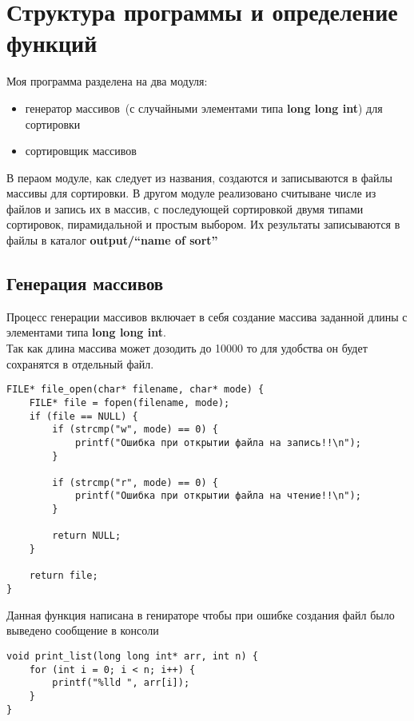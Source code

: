 \documentclass[a4paper,12pt,titlepage,finall]{article}
\begin{document}
\section{Структура программы и определение функций}

Моя программа разделена на два модуля:
\begin{itemize}
    \item генератор массивов~(с случайными элементами типа \textbf{long long int}) для сортировки
    \item сортировщик массивов
\end{itemize}

В пераом модуле, как следует из названия, создаются и записываются в файлы массивы для сортировки.
В другом модуле реализовано считыване числе из файлов и запись их в массив, с последующей сортировкой
двумя типами сортировок, пирамидальной и простым выбором. Их результаты записываются в файлы
в каталог \textbf{output/``name of sort''}

\subsection{Генерация массивов}

Процесс генерации массивов включает в себя создание массива заданной длины с элементами типа \textbf{long long int}. \\
Так как длина массива может дозодить до 10000 то для удобства он будет сохранятся в отдельный файл.

\begin{verbatim}
FILE* file_open(char* filename, char* mode) {
    FILE* file = fopen(filename, mode);
    if (file == NULL) {
        if (strcmp("w", mode) == 0) {
            printf("Ошибка при открытии файла на запись!!\n");
        }

        if (strcmp("r", mode) == 0) {
            printf("Ошибка при открытии файла на чтение!!\n");
        }

        return NULL;
    }

    return file;
}
\end{verbatim}

Данная функция написана в генираторе чтобы при ошибке создания файл было выведено сообщение в консоли

\begin{verbatim}
void print_list(long long int* arr, int n) {
    for (int i = 0; i < n; i++) {
        printf("%lld ", arr[i]);
    }
}
\end{verbatim}
\end{document}
